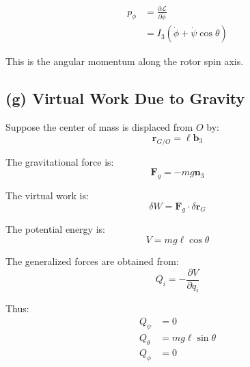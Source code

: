 \begin{align}
p_\phi
&=
\frac{\partial\mathcal{L}}{\partial\dot\phi}
\\
&=
I_3(\dot\phi+\dot\psi\cos\theta)
\end{align}

This is the angular momentum along the rotor spin axis.

\subsection*{(g) Virtual Work Due to Gravity}

Suppose the center of mass is displaced from $O$ by:
\[
\mathbf{r}_{G/O}=\ell\mathbf{b}_3
\]

The gravitational force is:
\[
\mathbf{F}_g = -mg\mathbf{n}_3
\]

The virtual work is:
\[
\delta W
=
\mathbf{F}_g\cdot\delta\mathbf{r}_G
\]

The potential energy is:
\[
V = mg\ell\cos\theta
\]

The generalized forces are obtained from:
\[
Q_i = -\frac{\partial V}{\partial q_i}
\]

Thus:
\begin{align}
Q_\psi &= 0
\\
Q_\theta &= mg\ell\sin\theta
\\
Q_\phi &= 0
\end{align}